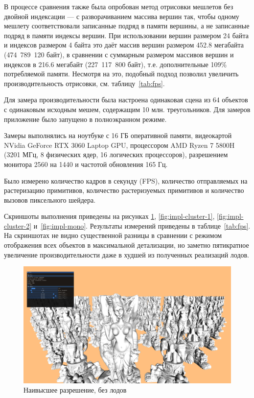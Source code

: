 В процессе сравнения также была опробован метод отрисовки мешлетов без двойной индексации --- с разворачиванием массива вершин так, чтобы одному мешлету соответствовали записанные подряд в памяти вершины, а не записанные подряд в памяти индексы вершин.
При использовании вершин размером 24 байта и индексов размером 4 байта это даёт массив вершин размером 452.8 мегабайта (474~789~120 байт), в сравнении с суммарным размером массивов вершин и индексов в 216.6 мегабайт (227~117~800 байт), т.е. дополнительные 109\% потребляемой памяти.
Несмотря на это, подобный подход позволил увеличить производительность отрисовки, см. таблицу~\ref{tab:fps}.

Для замера производительности была настроена одинаковая сцена из 64 объектов с одинаковым исходным мешем, содержащим 10 млн. треугольников.
Для замеров приложение было запущено в полноэкранном режиме.

Замеры выполнялись на ноутбуке с 16 ГБ оперативной памяти, видеокартой NVidia GeForce RTX 3060 Laptop GPU, процессором AMD Ryzen 7 5800H (3201 МГц, 8 физических ядер, 16 логических процессоров), разрешением монитора 2560 на 1440 и частотой обновления 165 Гц.

Было измерено количество кадров в секунду (FPS), количество отправляемых на растеризацию примитивов, количество растеризуемых примитивов и количество вызовов пиксельного шейдера.

Скриншоты выполнения приведены на рисунках \ref{fig:impl-lod0}, \ref{fig:impl-cluster-1}, \ref{fig:impl-cluster-2} и~\ref{fig:impl-mono}.
Результаты измерений приведены в таблице~\ref{tab:fps}.
На скриншотах не видно существенной разницы в сравнении с режимом отображения всех объектов в максимальной детализации, но заметно пятикратное увеличение производительности даже в худшей из полученных реализаций лодов.

\begin{figure}[H]
    \centering
    \includegraphics[width=\textwidth]{pics/comparison-0.png}
    \caption{Наивысшее разрешение, без лодов}
    \label{fig:impl-lod0}
\end{figure}


